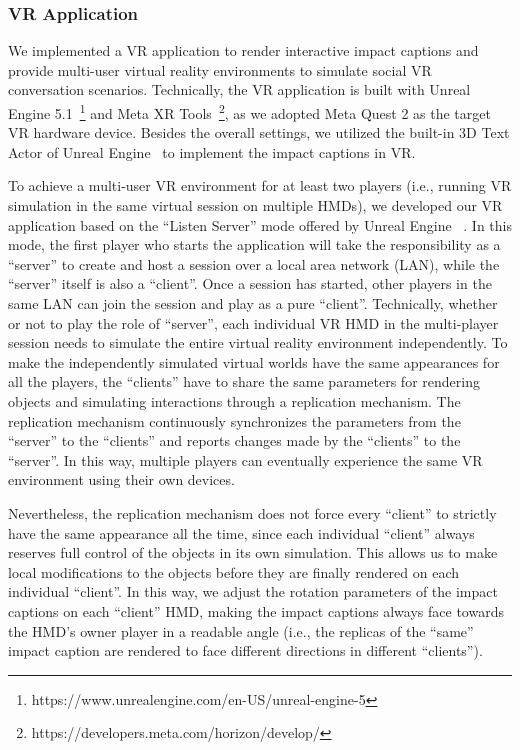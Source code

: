 \subsubsection{VR Application}
\label{sec_vr_application}
We implemented a VR application to render interactive impact captions and provide multi-user virtual reality environments to simulate social VR conversation scenarios. Technically, the VR application is built with Unreal Engine 5.1~\footnote{https://www.unrealengine.com/en-US/unreal-engine-5} and Meta XR Tools~\footnote{https://developers.meta.com/horizon/develop/}, as we adopted Meta Quest 2 as the target VR hardware device.
Besides the overall settings, we utilized the built-in 3D Text Actor of Unreal Engine~\cite{unrealtext2024} to implement the impact captions in VR.

To achieve a multi-user VR environment for at least two players (i.e., running VR simulation in the same virtual session on multiple HMDs), we developed our VR application based on the ``Listen Server'' mode offered by Unreal Engine ~\cite{unrealmultiplayer2024}. In this mode, the first player who starts the application will take the responsibility as a ``server'' to create and host a session over a local area network (LAN), while the ``server'' itself is also a ``client''. Once a session has started, other players in the same LAN can join the session and play as a pure ``client''.
Technically, whether or not to play the role of ``server'', each individual VR HMD in the multi-player session needs to simulate the entire virtual reality environment independently. 
To make the independently simulated virtual worlds have the same appearances for all the players, the ``clients'' have to share the same parameters for rendering objects and simulating interactions through a replication mechanism.
The replication mechanism continuously synchronizes the parameters from the ``server'' to the ``clients'' and reports changes made by the ``clients'' to the ``server''. In this way, multiple players can eventually experience the same VR environment using their own devices.

Nevertheless, the replication mechanism does not force every ``client'' to strictly have the same appearance all the time, since each individual ``client'' always reserves full control of the objects in its own simulation.
This allows us to make local modifications to the objects before they are finally rendered on each individual ``client''.
In this way, we adjust the rotation parameters of the impact captions on each ``client'' HMD, making the impact captions always face towards the HMD's owner player in a readable angle (i.e., the replicas of the ``same'' impact caption are rendered to face different directions in different ``clients'').


